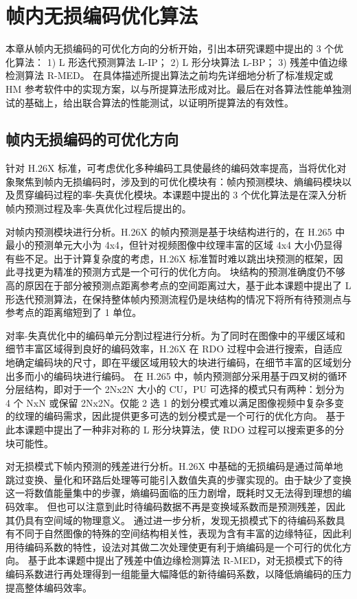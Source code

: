 \chapter{帧内无损编码优化算法}
\label{cha:c3}
本章从帧内无损编码的可优化方向的分析开始，引出本研究课题中提出的 3 个优化算法：
1) L 形迭代预测算法 L-IP；
2) L 形分块算法 L-BP；
3) 残差中值边缘检测算法 R-MED。
在具体描述所提出算法之前均先详细地分析了标准规定或 HM 参考软件中的实现方案，以与所提算法形成对比。最后在对各算法性能单独测试的基础上，给出联合算法的性能测试，以证明所提算法的有效性。

\section{帧内无损编码的可优化方向}
针对 H.26X 标准，可考虑优化多种编码工具使最终的编码效率提高，当将优化对象聚焦到帧内无损编码时，涉及到的可优化模块有：帧内预测模块、熵编码模块以及贯穿编码过程的率-失真优化模块。本课题中提出的 3 个优化算法是在深入分析帧内预测过程及率-失真优化过程后提出的。

对帧内预测模块进行分析。H.26X 的帧内预测是基于块结构进行的，在 H.265 中最小的预测单元大小为 4x4，但针对视频图像中纹理丰富的区域 4x4 大小仍显得有些不足。出于计算复杂度的考虑，H.26X 标准暂时难以跳出块预测的框架，因此寻找更为精准的预测方式是一个可行的优化方向。
块结构的预测准确度仍不够高的原因在于部分被预测点距离参考点的空间距离过大，基于此本课题中提出了 L 形迭代预测算法，在保持整体帧内预测流程仍是块结构的情况下将所有待预测点与参考点的距离缩短到了 1 单位。

对率-失真优化中的编码单元分割过程进行分析。为了同时在图像中的平缓区域和细节丰富区域得到良好的编码效率，H.26X 在 RDO 过程中会进行搜索，自适应地确定编码块的尺寸，即在平缓区域用较大的块进行编码，在细节丰富的区域划分出多而小的编码块进行编码。
在 H.265 中，帧内预测部分采用基于四叉树的循环分层结构，即对于一个 2Nx2N 大小的 CU，PU 可选择的模式只有两种：划分为 4 个 NxN 或保留 2Nx2N。仅能 2 选 1 的划分模式难以满足图像视频中复杂多变的纹理的编码需求，因此提供更多可选的划分模式是一个可行的优化方向。
基于此本课题中提出了一种非对称的 L 形分块算法，使 RDO 过程可以搜索更多的分块可能性。

对无损模式下帧内预测的残差进行分析。H.26X 中基础的无损编码是通过简单地跳过变换、量化和环路后处理等可能引入数值失真的步骤实现的。由于缺少了变换这一将数值能量集中的步骤，熵编码面临的压力剧增，既耗时又无法得到理想的编码效率。
但也可以注意到此时待编码数据不再是变换域系数而是预测残差，因此其仍具有空间域的物理意义。
通过进一步分析，发现无损模式下的待编码系数具有不同于自然图像的特殊的空间结构相关性，表现为含有丰富的边缘特征，因此利用待编码系数的特性，设法对其做二次处理使更有利于熵编码是一个可行的优化方向。
基于此本课题中提出了残差中值边缘检测算法 R-MED，对无损模式下的待编码系数进行再处理得到一组能量大幅降低的新待编码系数，以降低熵编码的压力提高整体编码效率。

